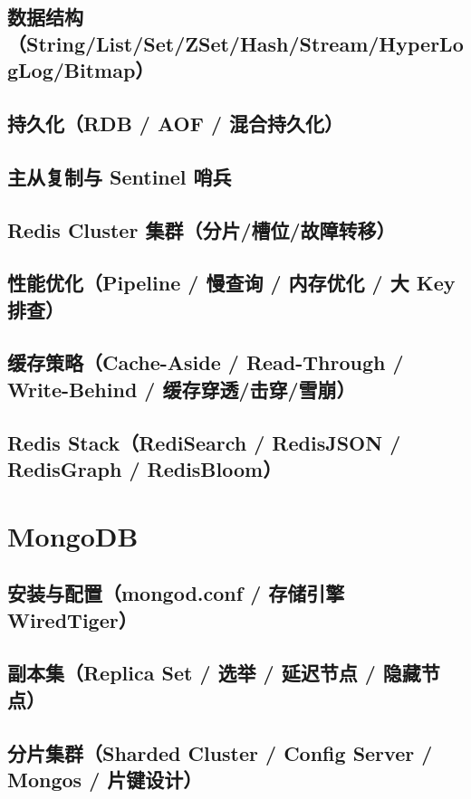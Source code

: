 \documentclass[12pt,UTF8]{ctexbook}
\begin{document}
  \section{数据结构（String/List/Set/ZSet/Hash/Stream/HyperLogLog/Bitmap）}
  \section{持久化（RDB / AOF / 混合持久化）}
  \section{主从复制与 Sentinel 哨兵}
  \section{Redis Cluster 集群（分片/槽位/故障转移）}
  \section{性能优化（Pipeline / 慢查询 / 内存优化 / 大 Key 排查）}
  \section{缓存策略（Cache-Aside / Read-Through / Write-Behind / 缓存穿透/击穿/雪崩）}
  \section{Redis Stack（RediSearch / RedisJSON / RedisGraph / RedisBloom）}

\chapter{MongoDB}
\label{chap:mongodb}

  \section{安装与配置（mongod.conf / 存储引擎 WiredTiger）}
  \section{副本集（Replica Set / 选举 / 延迟节点 / 隐藏节点）}
  \section{分片集群（Sharded Cluster / Config Server / Mongos / 片键设计）}
\end{document}

